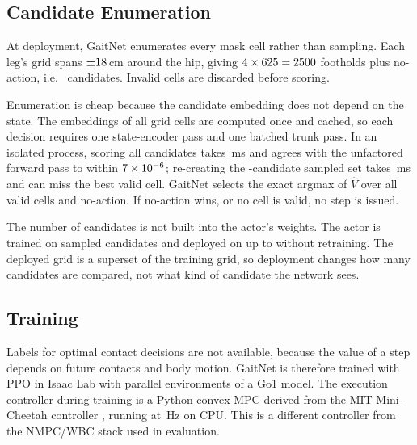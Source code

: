 \subsection{Candidate Enumeration}
\label{subsec:method-enumeration}

At deployment, GaitNet enumerates every mask cell rather than sampling.
Each leg's grid spans $\pm18$\,cm around the hip, giving
$4\times625=2500$ footholds
plus no-action, i.e.\ \corlTotalCandidatesDense{} candidates. Invalid
cells are discarded before scoring.

Enumeration is cheap because the candidate embedding does not depend
on the state. The embeddings of all grid cells are computed once and
cached, so each decision requires one state-encoder pass and one
batched trunk pass. In an isolated process, scoring all
\corlTotalCandidatesDense{} candidates takes \corlDenseScoreMs\,ms and
agrees with the unfactored forward pass to within
$7 \times 10^{-6}$; re-creating the
\corlTrainTotalCandidates-candidate sampled set takes
\corlSampledScoreMs\,ms and can miss the best valid cell. GaitNet
selects the exact argmax of $\hat V$ over all valid cells and
no-action. If no-action wins, or no cell is valid, no step is issued.

The number of candidates is not built into the actor's weights. The
actor is trained on \corlTrainTotalCandidates{} sampled candidates and
deployed on up to \corlTotalCandidatesDense{} without retraining. The
deployed grid is a superset of the training grid, so deployment
changes how many candidates are compared, not what kind of candidate
the network sees.

\subsection{Training}
\label{subsec:method-training}

Labels for optimal contact decisions are not available, because the
value of a step depends on future contacts and body motion. GaitNet is
therefore trained with PPO \cite{Schulman_proximal_2017} in Isaac Lab
with \corlParallelEnvs{} parallel environments of a Go1 model. The
execution controller during training is a Python convex MPC derived
from the MIT Mini-Cheetah controller \cite{di_mini_cheetah_2020,
zhuang_rl_mpc_locomotion_2025}, running at \corlTrainMpcHz\,Hz on CPU.
This is a different controller from the NMPC/WBC stack used in
evaluation.

